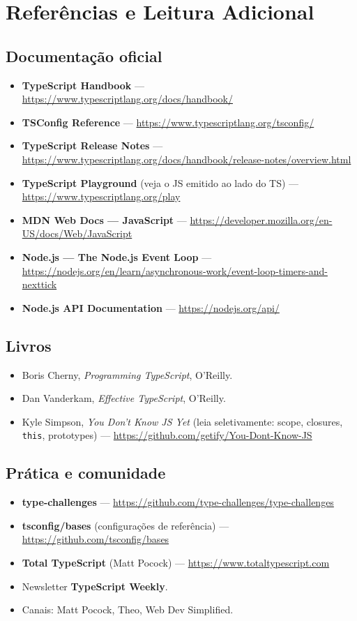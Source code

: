 \documentclass[12pt,a4paper,oneside]{book}
\newcommand{\code}[1]{\texttt{#1}}
\begin{document}
\appendix
\chapter{Referências e Leitura Adicional}

\section*{Documentação oficial}
\begin{itemize}
  \item \textbf{TypeScript Handbook} --- \url{https://www.typescriptlang.org/docs/handbook/}
  \item \textbf{TSConfig Reference} --- \url{https://www.typescriptlang.org/tsconfig/}
  \item \textbf{TypeScript Release Notes} --- \url{https://www.typescriptlang.org/docs/handbook/release-notes/overview.html}
  \item \textbf{TypeScript Playground} (veja o JS emitido ao lado do TS) --- \url{https://www.typescriptlang.org/play}
  \item \textbf{MDN Web Docs --- JavaScript} --- \url{https://developer.mozilla.org/en-US/docs/Web/JavaScript}
  \item \textbf{Node.js --- The Node.js Event Loop} --- \url{https://nodejs.org/en/learn/asynchronous-work/event-loop-timers-and-nexttick}
  \item \textbf{Node.js API Documentation} --- \url{https://nodejs.org/api/}
\end{itemize}

\section*{Livros}
\begin{itemize}
  \item Boris Cherny, \emph{Programming TypeScript}, O'Reilly.
  \item Dan Vanderkam, \emph{Effective TypeScript}, O'Reilly.
  \item Kyle Simpson, \emph{You Don't Know JS Yet} (leia seletivamente: scope, closures, \code{this}, prototypes) --- \url{https://github.com/getify/You-Dont-Know-JS}
\end{itemize}

\section*{Prática e comunidade}
\begin{itemize}
  \item \textbf{type-challenges} --- \url{https://github.com/type-challenges/type-challenges}
  \item \textbf{tsconfig/bases} (configurações de referência) --- \url{https://github.com/tsconfig/bases}
  \item \textbf{Total TypeScript} (Matt Pocock) --- \url{https://www.totaltypescript.com}
  \item Newsletter \textbf{TypeScript Weekly}.
  \item Canais: Matt Pocock, Theo, Web Dev Simplified.
\end{itemize}
\end{document}
